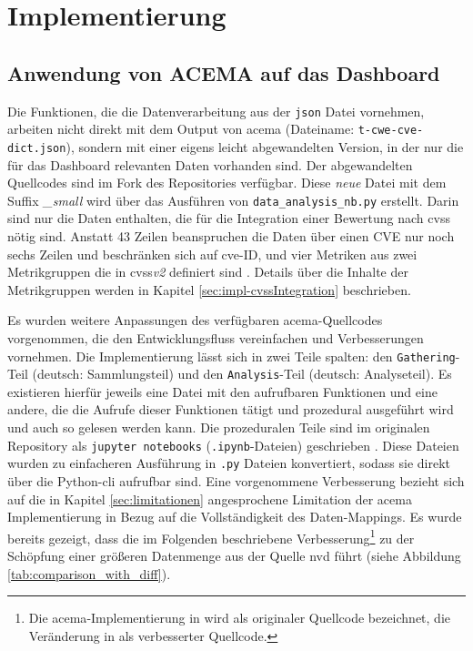 \chapter{Implementierung}
\label{chap:implementierung}
\section[Anwendung von ACEMA]{Anwendung von ACEMA auf das Dashboard}
\label{sec:impl-anwendungVonAcema}

Die Funktionen, die die Datenverarbeitung aus der \verb|json| Datei vornehmen, arbeiten nicht direkt mit dem Output von \gls{acema} (Dateiname: \verb|t-cwe-cve-dict.json|), sondern mit einer eigens leicht abgewandelten Version, in der nur die für das Dashboard relevanten Daten vorhanden sind. Der abgewandelten Quellcodes sind im Fork \autocite{jesseDumpeldownAcema_oranDev} des Repositories \autocite{klement2023acema}  verfügbar. Diese \textit{neue} Datei mit dem Suffix \textit{\_small} wird über das Ausführen von \verb|data_analysis_nb.py| erstellt. Darin sind nur die Daten enthalten, die für die Integration einer Bewertung nach \gls{cvss} nötig sind. Anstatt 43 Zeilen beanspruchen die Daten über einen CVE nur noch sechs Zeilen und beschränken sich auf \gls{cve}-ID, und vier Metriken aus zwei Metrikgruppen die in \gls{cvss}\textit{v2} definiert sind \autocite{CVSSV2Complete}. Details über die Inhalte der Metrikgruppen werden in Kapitel \ref{sec:impl-cvssIntegration} beschrieben.

Es wurden weitere Anpassungen des verfügbaren \gls{acema}-Quellcodes vorgenommen, die den Entwicklungsfluss vereinfachen und Verbesserungen vornehmen. Die Implementierung lässt sich in zwei Teile spalten: den \verb|Gathering|-Teil (deutsch: Sammlungsteil) und den \verb|Analysis|-Teil (deutsch: Analyseteil). Es existieren hierfür jeweils eine Datei mit den aufrufbaren Funktionen und eine andere, die die Aufrufe dieser Funktionen tätigt und prozedural ausgeführt wird und auch so gelesen werden kann.
Die prozeduralen Teile sind im originalen Repository als \verb|jupyter notebooks| (\verb|.ipynb|-Dateien) geschrieben \autocite{klement2023acema} \autocite{ProjectJupyter}. Diese Dateien wurden zu einfacheren Ausführung in \verb|.py| Dateien konvertiert, sodass sie direkt über die Python-\gls{cli} aufrufbar sind.
Eine vorgenommene Verbesserung bezieht sich auf die in Kapitel \ref{sec:limitationen} angesprochene Limitation der \gls{acema} Implementierung in Bezug auf die Vollständigkeit des Daten-Mappings. Es wurde bereits gezeigt, dass die im Folgenden beschriebene Verbesserung\footnote{Die \gls{acema}-Implementierung in \autocite{klement2023acema} wird als originaler Quellcode bezeichnet, die Veränderung in \autocite{jesseDumpeldownAcema_oranDev} als verbesserter Quellcode.} zu der Schöpfung einer größeren Datenmenge aus der Quelle \gls{nvd} führt (siehe Abbildung \ref{tab:comparison_with_diff}).

